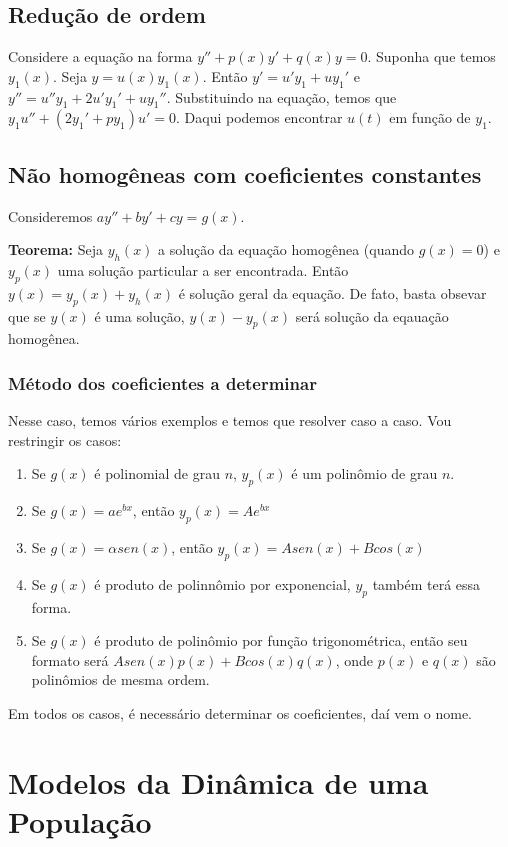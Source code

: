 \documentclass[12pt]{article}
\begin{document}
\subsection{Redução de ordem}

Considere a equação na forma $y'' + p(x)y' + q(x)y = 0$. Suponha que temos
$y_1(x)$. Seja $y = u(x)y_1(x)$. Então $y' = u'y_1 + uy_1'$ e $y'' = u''y_1 +
2u'y_1' + uy_1''$. Substituindo na equação, temos que $y_1u'' + (2y_1' +
py_1)u' = 0$. Daqui podemos encontrar $u(t)$ em função de $y_1$. 

\subsection{Não homogêneas com coeficientes constantes}

Consideremos $ay'' + by' + cy = g(x)$.  

\textbf{Teorema:} Seja $y_h(x)$ a solução da equação homogênea (quando $g(x) =
0$) e $y_p(x)$ uma solução particular a ser encontrada. Então $y(x) = y_p(x) +
y_h(x)$ é solução geral da equação. De fato, basta obsevar que se $y(x)$ é uma
solução, $y(x) - y_p(x)$ será solução da eqauação homogênea. 

\subsubsection{Método dos coeficientes a determinar}

Nesse caso, temos vários exemplos e temos que resolver caso a caso. Vou
restringir os casos:

\begin{enumerate}
    \item Se $g(x)$ é polinomial de grau $n$, $y_p(x)$ é um polinômio de grau
    $n$. 
    \item Se $g(x) = ae^{bx}$, então $y_p(x) = Ae^{bx}$
    \item Se $g(x) = \alpha sen(x)$, então $y_p(x) = Asen(x) + Bcos(x)$
    \item Se $g(x)$ é produto de polinnômio por exponencial, $y_p$ também terá
   essa forma. 
   \item Se $g(x)$ é produto de polinômio por função trigonométrica, então seu
  formato será  $Asen(x)p(x) + Bcos(x)q(x)$, onde $p(x)$ e $q(x)$ são
  polinômios de mesma ordem. 
\end{enumerate}

Em todos os casos, é necessário determinar os coeficientes, daí vem o nome. 
    
\section{Modelos da Dinâmica de uma População}
\end{document}
